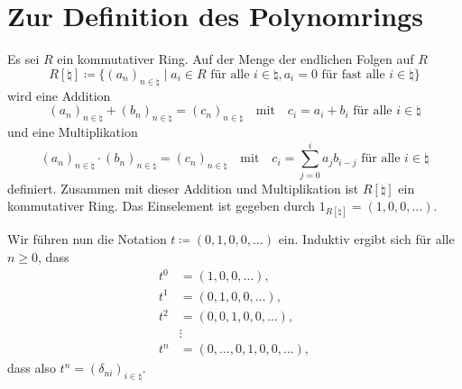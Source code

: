 \section{Zur Definition des Polynomrings}

Es sei $R$ ein kommutativer Ring.
Auf der Menge der endlichen Folgen auf $R$
\begin{equation}
  \tag{D}
  \label{equation: definition}
  R[\natural]
  \coloneqq
  \{
    (a_n)_{n \in \natural}
  \mid
    \text{$a_i \in R$ für alle $i \in \natural$},
    \text{$a_i = 0$ für fast alle $i \in \natural$} 
  \}
\end{equation}
wird eine Addition
\begin{equation}
  \tag{A}
  \label{equation: addition}
    (a_n)_{n \in \natural} + (b_n)_{n \in \natural}
  = (c_n)_{n \in \natural}
  \quad\text{mit}\quad
  \text{$c_i = a_i + b_i$ für alle $i \in \natural$}
\end{equation}
und eine Multiplikation
\begin{equation}
  \tag{M}
  \label{equation: multiplication}
    (a_n)_{n \in \natural} \cdot (b_n)_{n \in \natural}
  = (c_n)_{n \in \natural}
  \quad\text{mit}\quad
  \text{$c_i = \sum_{j=0}^i a_j b_{i-j}$ für alle $i \in \natural$}
\end{equation}
definiert.
Zusammen mit dieser Addition und Multiplikation ist $R[\natural]$ ein kommutativer Ring.
Das Einselement ist gegeben durch $1_{R[\natural]} = (1, 0, 0, \dotsc)$.

Wir führen nun die Notation $t \coloneqq (0, 1, 0, 0, \dotsc)$ ein.
Induktiv ergibt sich für alle $n \geq 0$, dass
\begin{align*}
  t^0 &= (1, 0, 0, \dotsc),
  \\
  t^1 &= (0, 1, 0, 0, \dotsc),
  \\
  t^2 &= (0, 0, 1, 0, 0, \dotsc),
  \\
      &\vdots
  \\
  t^n &= (0, \dotsc, 0, 1, 0, 0, \dotsc),
\end{align*}
dass also $t^n = (\delta_{ni})_{i \in \natural}$.

